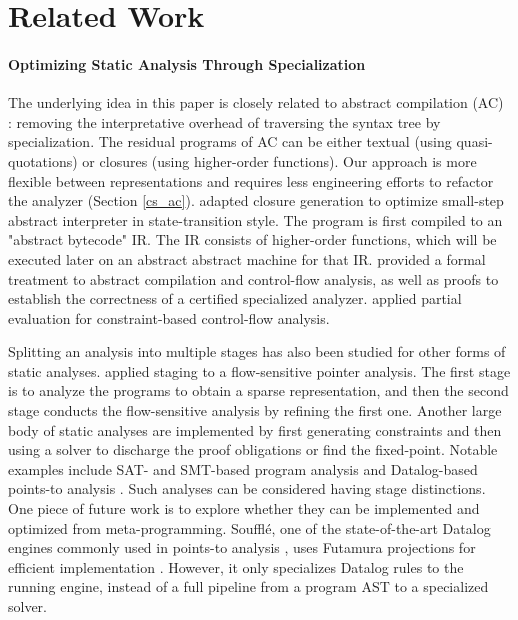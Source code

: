 \section{Related Work}

\paragraph{Optimizing Static Analysis Through Specialization} The underlying
idea in this paper is closely related to abstract compilation (AC)
\cite{Boucher:1996:ACN:647473.727587}: removing the interpretative overhead of
traversing the syntax tree by specialization. The residual programs of AC can
be either textual (using quasi-quotations) or closures (using higher-order
functions).  Our approach is more flexible between representations and requires
less engineering efforts to refactor the analyzer (Section \ref{cs_ac}).
\citet{Johnson:2013:OAA:2500365.2500604} adapted closure generation to optimize
small-step abstract interpreter in state-transition style. The program
is first compiled to an "abstract bytecode" IR. The IR consists of higher-order
functions, which will be executed later on an abstract abstract machine for
that IR.  \citet{damian1999partial} provided a formal treatment to abstract
compilation and control-flow analysis, as well as proofs to establish the
correctness of a certified specialized analyzer.  \citet{amtoft1999partial}
applied partial evaluation for constraint-based control-flow analysis.

Splitting an analysis into multiple stages has also been studied for other
forms of static analyses.
\citet{DBLP:conf/cgo/HardekopfL11} applied staging to a
flow-sensitive pointer analysis. The first stage is to analyze the
programs to obtain a sparse representation, and then the second
stage conducts the flow-sensitive analysis by refining the first
one. Another large body of static analyses are implemented by
first generating constraints and then using a solver to discharge the
proof obligations or find the fixed-point. Notable examples include
SAT- and SMT-based program analysis
\cite{Gulwani:2008:PAC:1375581.1375616} and Datalog-based points-to
analysis \cite{Smaragdakis:2015:PA:2802194.2802195}.
Such analyses can be considered having stage distinctions.  One piece of future
work is to explore whether they can be implemented and optimized from
meta-programming. 
Souffl{\'e}, one of the state-of-the-art Datalog engines commonly used in
points-to analysis \cite{Antoniadis:2017:PDS:3088515.3088522}, uses Futamura
projections for efficient implementation \cite{10.1007/978-3-319-41540-6_23}.
However, it only specializes Datalog rules to the running engine, instead of a
full pipeline from a program AST to a specialized solver.

